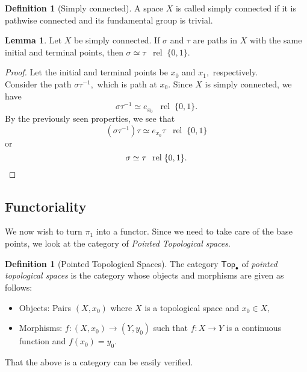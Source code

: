 \documentclass[12pt]{article}
\theoremstyle{definition}
\numberwithin{thm}{section}
\newtheorem{lem}[thm]{Lemma}
\newtheorem{defn}[thm]{Definition}
\newcommand{\rel}{\;\;\operatorname{rel}\;}
\begin{document}
\begin{defn}[Simply connected]
	A space $X$ is called simply connected if it is pathwise connected and its fundamental group is trivial.
\end{defn}
\begin{lem} \label{lem:simpconnpathshomot}
	Let $X$ be simply connected. If $\sigma$ and $\tau$ are paths in $X$ with the same initial and terminal points, then $\sigma \simeq \tau \rel \{0, 1\}.$
\end{lem}
\begin{proof} 
	Let the initial and terminal points be $x_0$ and $x_1,$ respectively.\\
	Consider the path $\sigma\tau^{-1},$ which is path at $x_0.$ Since $X$ is simply connected, we have
	\begin{equation*} 
		\sigma\tau^{-1} \simeq e_{x_0} \rel \{0, 1\}.
	\end{equation*}
	By the previously seen properties, we see that
	\begin{equation*} 
		(\sigma\tau^{-1})\tau \simeq e_{x_0}\tau \rel \{0, 1\}
	\end{equation*}
	or
	\begin{equation*} 
		\sigma \simeq \tau \rel \{0, 1\}. \qedhere
	\end{equation*}
\end{proof}
\subsection{Functoriality}
We now wish to turn $\pi_1$ into a functor. Since we need to take care of the base points, we look at the category of \emph{Pointed Topological spaces}.
\begin{defn}[Pointed Topological Spaces]
	The category $\mathsf{Top}_\bullet$ of \emph{pointed topological spaces} is the category whose objects and morphisms are given as follows:
	\begin{itemize}
		\item Objects: Pairs $(X, x_0)$ where $X$ is a topological space and $x_0 \in X,$
		\item Morphisms: $f:(X, x_0) \to (Y, y_0)$ such that $f:X\to Y$ is a continuous function and $f(x_0) = y_0.$
	\end{itemize}
\end{defn}
That the above is a category can be easily verified.
\end{document}
